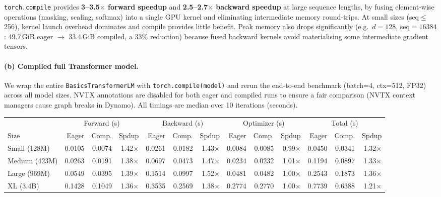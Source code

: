 \documentclass[11pt]{article}
\begin{document}
\texttt{torch.compile} provides \textbf{3--3.5$\times$ forward speedup}
and \textbf{2.5--2.7$\times$ backward speedup} at large sequence
lengths, by fusing element-wise operations (masking, scaling,
softmax) into a single GPU kernel and eliminating intermediate
memory round-trips.  At small sizes (seq$\leq$256), kernel launch
overhead dominates and compile provides little benefit.
Peak memory also drops significantly (e.g.\ $d{=}128$, seq${=}16384$:
49.7\,GiB eager $\to$ 33.4\,GiB compiled, a 33\% reduction) because
fused backward kernels avoid materialising some intermediate gradient
tensors.

\paragraph{(b) Compiled full Transformer model.}

We wrap the entire \texttt{BasicsTransformerLM} with
\texttt{torch.compile(model)} and rerun the end-to-end
benchmark (batch=4, ctx=512, FP32) across all model sizes.
NVTX annotations are disabled for both eager and compiled runs
to ensure a fair comparison (NVTX context managers cause graph
breaks in Dynamo).
All timings are median over 10 iterations (seconds).

\begin{center}
\scriptsize
\begin{tabular}{l | r r r | r r r | r r r | r r r}
\toprule
 & \multicolumn{3}{c|}{Forward (s)} & \multicolumn{3}{c|}{Backward (s)} & \multicolumn{3}{c|}{Optimizer (s)} & \multicolumn{3}{c}{Total (s)} \\
Size & Eager & Comp. & Spdup & Eager & Comp. & Spdup & Eager & Comp. & Spdup & Eager & Comp. & Spdup \\
\midrule
Small (128M)
  & 0.0105 & 0.0074 & 1.42$\times$
  & 0.0261 & 0.0182 & 1.43$\times$
  & 0.0084 & 0.0085 & 0.99$\times$
  & 0.0450 & 0.0341 & 1.32$\times$ \\
Medium (423M)
  & 0.0263 & 0.0191 & 1.38$\times$
  & 0.0697 & 0.0473 & 1.47$\times$
  & 0.0234 & 0.0232 & 1.01$\times$
  & 0.1194 & 0.0897 & 1.33$\times$ \\
Large (969M)
  & 0.0549 & 0.0395 & 1.39$\times$
  & 0.1514 & 0.0997 & 1.52$\times$
  & 0.0481 & 0.0482 & 1.00$\times$
  & 0.2543 & 0.1873 & 1.36$\times$ \\
XL (3.4B)
  & 0.1428 & 0.1049 & 1.36$\times$
  & 0.3535 & 0.2569 & 1.38$\times$
  & 0.2774 & 0.2770 & 1.00$\times$
  & 0.7739 & 0.6388 & 1.21$\times$ \\
\bottomrule
\end{tabular}
\end{center}
\end{document}

